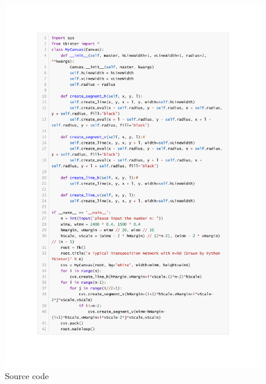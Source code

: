 \documentclass[12pt,a4paper]{article}
\theoremstyle{definition}
\begin{document}
\begin{enumerate}
\begin{figure}[htbp]
    \includegraphics[width=1\textwidth]{Fig-Code.pdf}
    \caption{Source code}\label{Fig-Code}
\end{figure}
\end{enumerate}

\end{document}
